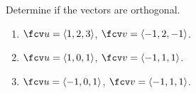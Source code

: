 Determine if the vectors are orthogonal.

\begin{enumerate}
\item $\fcv u=\langle1, 2, 3 \rangle$, $\fcv v=\langle-1,2,-1\rangle$.
\item $\fcv u=\langle 1, 0, 1 \rangle$, $\fcv v=\langle-1,1,1\rangle$.
\item $\fcv u=\langle -1, 0, 1 \rangle$, $\fcv v=\langle-1,1,1\rangle$.
\end{enumerate}
